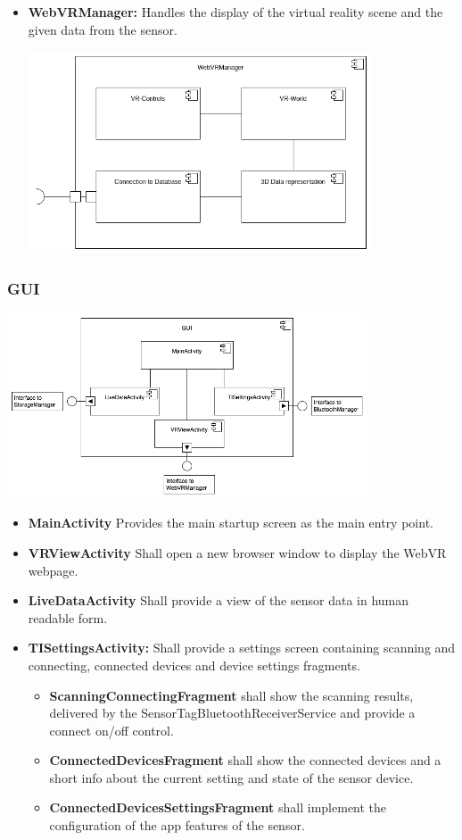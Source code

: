 \begin{itemize}
  \item \textbf{WebVRManager:} Handles the display of the virtual reality scene and the given data from the sensor.
  
 \includegraphics[width=0.8\textwidth]{pics/WebVRManager.png}

\end{itemize}

\subsubsection{GUI}

\includegraphics[width=0.8\textwidth]{pics/GUI.png}

\begin{itemize}
  \item \textbf{MainActivity} Provides the main startup screen as the main entry point.
  \item \textbf{VRViewActivity} Shall open a new browser window to display the WebVR webpage.
  \item \textbf{LiveDataActivity} Shall provide a view of the sensor data in human readable form.
  \item \textbf{TISettingsActivity:} Shall provide a settings screen containing scanning and connecting, connected devices and device settings fragments.
  \begin{itemize}
    \item \textbf{ScanningConnectingFragment} shall show the scanning results, delivered by the SensorTagBluetoothReceiverService and provide a connect on/off control.
    \item \textbf{ConnectedDevicesFragment} shall show the connected devices and a short info about the current setting and state of the sensor device.
    \item \textbf{ConnectedDevicesSettingsFragment} shall implement the configuration of the app features of the sensor.
  \end{itemize}
\end{itemize}

